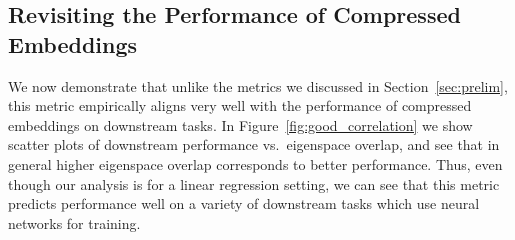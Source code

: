 \subsection{Revisiting the Performance of Compressed Embeddings}
\label{subsec:revisit}
We now demonstrate that unlike the metrics we discussed in Section~\ref{sec:prelim}, this metric empirically aligns very well with the performance of compressed embeddings on downstream tasks.
In Figure~\ref{fig:good_correlation} we show scatter plots of downstream performance vs.\ eigenspace overlap, and see that in general higher eigenspace overlap corresponds to better performance.
Thus, even though our analysis is for a linear regression setting, we can see that this metric predicts performance well on a variety of downstream tasks which use neural networks for training.




